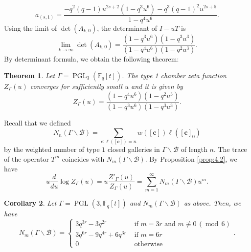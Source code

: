 \documentclass[11pt]{amsart}
\newtheorem{thm}{Theorem}[section]
\newtheorem{coro}[thm]{Corollary}
\theoremstyle{definition}
\theoremstyle{remark}
\numberwithin{equation}{section}
\newcommand{\PGL}{\operatorname{PGL}}
\begin{document}
\begin{equation*}
a_{(s,1)}=\frac{-q^2(q-1)u^{2s+2}(1-q^3u^6)-q^3(q-1)^2u^{2s+5}}{1-q^4u^6}.
\end{equation*}
Using the limit of $\det(A_{k,0})$, the determinant of $I-uT$ is 
\begin{equation*}
\lim_{k\rightarrow \infty}\det(A_{k,0})=\frac{(1-q^3u^6)(1-q^3u^3)}{(1-q^4u^6)(1-q^2u^3)}.
\end{equation*}
By determinant formula, we obtain the following theorem:
\begin{thm}\label{thm:5.1} Let $\Gamma=\PGL_3(\mathbb{F}_q[t])$. The type 1 chamber zeta function $Z_\Gamma(u)$ converges for sufficiently small $u$ and it is given by
$$Z_{\Gamma}(u)=\frac{(1-q^4u^6)(1-q^2u^3)}{(1-q^3u^6)(1-q^3u^3)}.$$
\end{thm}
Recall that we defined $$N_n(\Gamma\backslash\mathcal{B})=\sum_{c\colon\ell([\mathbf{c}])=n}w([\mathbf{c}])\ell([\mathbf{c}]_0)$$ by the weighted number of type $1$ closed galleries in $\Gamma\backslash \mathcal{B}$ of length $n$.
The trace of the operator $T^m$ coincides with $N_m(\Gamma\backslash\mathcal{B})$. By Proposition \ref{prop:4.2}, we have
\begin{equation}\label{eq:5.1}
u\frac{d}{du}\log Z_{\Gamma}(u)=u\frac{Z'_{\Gamma}(u)}{Z_{\Gamma}(u)}=\sum_{m=1}^{\infty} N_m(\Gamma\backslash \mathcal{B})u^m.
\end{equation}
\begin{coro} Let $\Gamma=\operatorname{PGL}(3,\mathbb{F}_q[t])$ and $N_m(\Gamma\backslash\mathcal{B})$ as above. Then, we have
$$N_m(\Gamma\backslash\mathcal{B})=\left\{\begin{array}{ll}3q^{3r}-3q^{2r} & \textrm{ if }m=3r\textrm{ and }m\not\equiv 0 \,(\operatorname{mod}\,{6}) \\ 
3q^{6r}-9q^{4r}+6q^{3r} & \textrm{ if }m=6r \\ 0 
& \textrm{ otherwise}\end{array}\right..$$
\end{coro}
\end{document}
